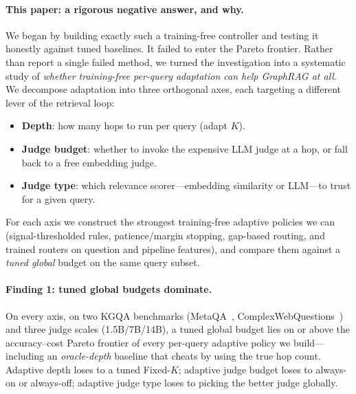 \paragraph{This paper: a rigorous negative answer, and why.}
We began by building exactly such a training-free controller and testing it honestly against tuned baselines. It failed to enter the Pareto frontier. Rather than report a single failed method, we turned the investigation into a systematic study of \emph{whether training-free per-query adaptation can help GraphRAG at all}. We decompose adaptation into three orthogonal axes, each targeting a different lever of the retrieval loop:
\begin{itemize}[leftmargin=*,nosep]
  \item \textbf{Depth}: how many hops to run per query (adapt $K$).
  \item \textbf{Judge budget}: whether to invoke the expensive LLM judge at a hop, or fall back to a free embedding judge.
  \item \textbf{Judge type}: which relevance scorer---embedding similarity or LLM---to trust for a given query.
\end{itemize}
For each axis we construct the strongest training-free adaptive policies we can (signal-thresholded rules, patience/margin stopping, gap-based routing, and trained routers on question and pipeline features), and compare them against a \emph{tuned global} budget on the same query subset.

\paragraph{Finding 1: tuned global budgets dominate.}
On every axis, on two KGQA benchmarks (MetaQA~\cite{zhang2017variational}, ComplexWebQuestions~\cite{talmor2018knowledgebase}) and three judge scales (1.5B/7B/14B), a tuned global budget lies on or above the accuracy--cost Pareto frontier of every per-query adaptive policy we build---including an \emph{oracle-depth} baseline that cheats by using the true hop count. Adaptive depth loses to a tuned Fixed-$K$; adaptive judge budget loses to always-on or always-off; adaptive judge type loses to picking the better judge globally.

